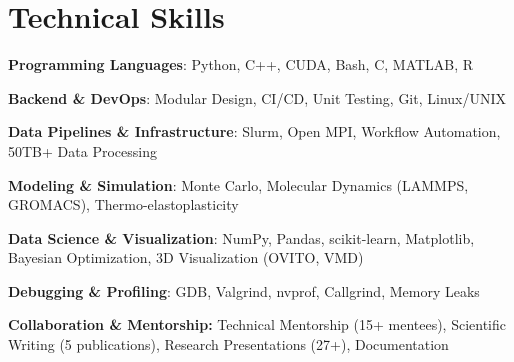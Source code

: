 \section*{Technical Skills}
\begin{tabitemize}
  \item \textbf{Programming Languages}: Python, C++, CUDA, Bash, C, MATLAB, R
  \item \textbf{Backend \& DevOps}: Modular Design, CI/CD, Unit Testing, Git, Linux/UNIX
  \item \textbf{Data Pipelines \& Infrastructure}: Slurm, Open MPI, Workflow Automation, 50TB+ Data Processing
  \item \textbf{Modeling \& Simulation}: Monte Carlo, Molecular Dynamics (LAMMPS, GROMACS), Thermo-elastoplasticity
  \item \textbf{Data Science \& Visualization}: NumPy, Pandas, scikit-learn, Matplotlib, Bayesian Optimization, 3D Visualization (OVITO, VMD)
  \item \textbf{Debugging \& Profiling}: GDB, Valgrind, nvprof, Callgrind, Memory Leaks
  \item \textbf{Collaboration \& Mentorship:} Technical Mentorship (15+ mentees), Scientific Writing (5 publications), Research Presentations (27+), Documentation
\end{tabitemize}
\vspace{-1.2\baselineskip}
